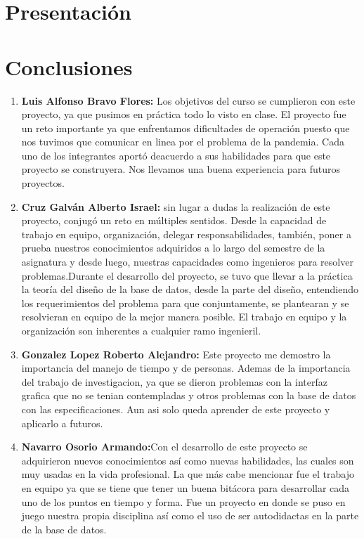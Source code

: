 \documentclass[10pt]{report}
\begin{document}
\chapter*{Presentación}
\chapter*{Conclusiones}

\begin{enumerate}
    \item \textbf{Luis Alfonso Bravo Flores:} Los objetivos del curso se cumplieron con este proyecto, ya que pusimos en práctica todo lo visto en clase. El proyecto fue un reto importante ya que enfrentamos dificultades de operación puesto que nos tuvimos que comunicar en linea por el problema de la pandemia. Cada uno de los integrantes aportó deacuerdo a sus habilidades para que este proyecto se construyera. Nos llevamos una buena experiencia para futuros proyectos.
    \item \textbf{Cruz Galván Alberto Israel:} sin lugar a dudas la realización de este proyecto, conjugó un reto en múltiples sentidos. Desde la capacidad de trabajo en equipo, organización, delegar responsabilidades, también, poner a prueba nuestros conocimientos adquiridos a lo largo del semestre de la asignatura y desde luego, nuestras capacidades como ingenieros para resolver problemas.Durante el desarrollo del proyecto, se tuvo que llevar a la práctica la teoría del diseño de la base de datos, desde la parte del diseño, entendiendo los requerimientos del problema para que conjuntamente, se plantearan y se resolvieran en equipo de la mejor manera posible. El trabajo en equipo y la organización son inherentes a cualquier ramo ingenieril.  
    \item \textbf{Gonzalez Lopez Roberto Alejandro:} Este proyecto me demostro la importancia del manejo de tiempo y de personas. Ademas de la importancia del trabajo de investigacion, ya que se dieron problemas con la interfaz grafica que no se tenian contempladas y otros problemas con la base de datos con las especificaciones. Aun asi solo queda aprender de este proyecto y aplicarlo a futuros.
    \item \textbf{Navarro Osorio Armando:}Con el desarrollo de este proyecto se adquirieron nuevos conocimientos así como nuevas habilidades, las cuales son muy usadas en la vida profesional. La que más cabe mencionar fue el trabajo en equipo ya que se tiene que tener un buena bitácora para desarrollar cada uno de los puntos en tiempo y forma.  Fue un proyecto en donde se puso en juego nuestra propia disciplina así como el uso de ser autodidactas en la parte de la base de datos.

\end{enumerate}


\printbibliography
\end{document}
